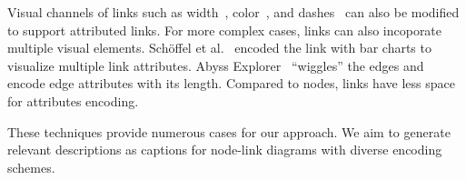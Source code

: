 Visual channels of links such as width~\cite{Katz_2015}, color~\cite{DBLP:journals/tvcg/Guo09}, and dashes~\cite{DBLP:journals/bmcbi/JunkerKS06} can also be modified to support attributed links.
For more complex cases, links can also incoporate multiple visual elements.
Sch{\"{o}}ffel et al.~\cite{DBLP:conf/iv/SchoffelSE16} encoded the link with bar charts to visualize multiple link attributes.
Abyss Explorer~\cite{DBLP:journals/tvcg/NielsenJBJ09} ``wiggles'' the edges and encode edge attributes with its length.
Compared to nodes, links have less space for attributes encoding.

These techniques provide numerous cases for our approach.
We aim to generate relevant descriptions as captions for node-link diagrams with diverse encoding schemes.

